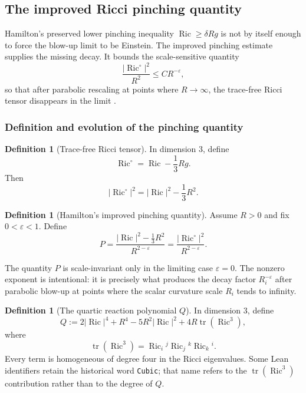 \documentclass[11pt]{article}
\theoremstyle{plain}
\theoremstyle{definition}
\newtheorem{definition}[theorem]{Definition}
\theoremstyle{remark}
\newcommand{\Ric}{\operatorname{Ric}}
\newcommand{\tr}{\operatorname{tr}}
\newcommand{\norm}[1]{\left|#1\right|}
\newcommand{\eps}{\varepsilon}
\newcommand{\del}{\delta}
\begin{document}
\subsection{The improved Ricci pinching quantity}

Hamilton's preserved lower pinching inequality \(\Ric \ge \del Rg\) is not
by itself enough to force the blow-up limit to be Einstein.  The improved
pinching estimate supplies the missing decay.  It bounds the scale-sensitive
quantity
\[
  \frac{\norm{\Ric^\circ}^2}{R^2}
  \le C R^{-\eps},
\]
so that after parabolic rescaling at points where \(R\to\infty\), the
trace-free Ricci tensor disappears in the limit \cite{MR664497}.

\subsubsection{Definition and evolution of the pinching quantity}

\begin{definition}[Trace-free Ricci tensor]
\label{def:tracefree-ricci}
In dimension $3$, define
\[
\Ric^\circ
=
\Ric-\frac13Rg.
\]
Then
\[
\norm{\Ric^\circ}^2
=
\norm{\Ric}^2-\frac13R^2.
\]
\end{definition}

\begin{definition}[Hamilton's improved pinching quantity]
\label{def:pinching-P}
Assume $R>0$ and fix $0<\eps<1$. Define
\[
P
=
\frac{\norm{\Ric}^2-\frac13R^2}{R^{2-\eps}}
=
\frac{\norm{\Ric^\circ}^2}{R^{2-\eps}}.
\]
\end{definition}

The quantity \(P\) is scale-invariant only in the limiting case
\(\eps=0\).  The nonzero exponent is intentional: it is precisely what
produces the decay factor \(R_i^{-\eps}\) after parabolic blow-up at points
where the scalar curvature scale \(R_i\) tends to infinity.

\begin{definition}[The quartic reaction polynomial $Q$]
\label{def:Q}
In dimension $3$, define
\[
Q
:=
2\norm{\Ric}^4
+R^4
-5R^2\norm{\Ric}^2
+4R\tr(\Ric^3),
\]
where
\[
\tr(\Ric^3)=\Ric_i{}^j\Ric_j{}^k\Ric_k{}^i.
\]
Every term is homogeneous of degree four in the Ricci eigenvalues.  Some Lean
identifiers retain the historical word \texttt{Cubic}; that name refers to the
\(\tr(\Ric^3)\) contribution rather than to the degree of $Q$.

\end{definition}
\end{document}
